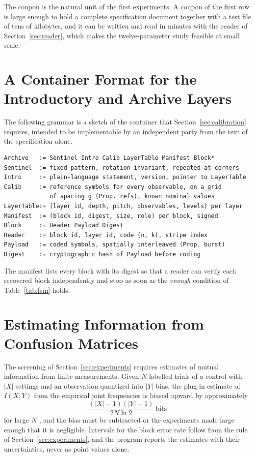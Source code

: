The coupon is the natural unit of the first experiments. A coupon of the first row is large enough to hold a complete specification document together with a test file of tens of kilobytes, and it can be written and read in minutes with the reader of Section~\ref{sec:reader}, which makes the twelve-parameter study feasible at small scale.

\section{A Container Format for the Introductory and Archive Layers}\label{app:format}

The following grammar is a sketch of the container that Section~\ref{sec:calibration} requires, intended to be implementable by an independent party from the text of the specification alone.
\begin{verbatim}
Archive   := Sentinel Intro Calib LayerTable Manifest Block*
Sentinel  := fixed pattern, rotation-invariant, repeated at corners
Intro     := plain-language statement, version, pointer to LayerTable
Calib     := reference symbols for every observable, on a grid
             of spacing g (Prop. refs), known nominal values
LayerTable:= (layer id, depth, pitch, observables, levels) per layer
Manifest  := (block id, digest, size, role) per block, signed
Block     := Header Payload Digest
Header    := block id, layer id, code (n, k), stripe index
Payload   := coded symbols, spatially interleaved (Prop. burst)
Digest    := cryptographic hash of Payload before coding
\end{verbatim}
The manifest lists every block with its digest so that a reader can verify each recovered block independently and stop as soon as the \emph{enough} condition of Table~\ref{tab:fsm} holds.

\section{Estimating Information from Confusion Matrices}\label{app:estimate}

The screening of Section~\ref{sec:experiments} requires estimates of mutual information from finite measurements. Given $N$ labelled trials of a control with $|X|$ settings and an observation quantized into $|Y|$ bins, the plug-in estimate of $I(X;Y)$ from the empirical joint frequencies is biased upward by approximately
\[
\frac{(|X|-1)(|Y|-1)}{2N\ln2}\ \text{bits}
\]
for large $N$ \cite{miller1955}, and the bias must be subtracted or the experiments made large enough that it is negligible. Intervals for the block error rate follow from the rule of Section~\ref{sec:experiments}, and the program reports the estimates with their uncertainties, never as point values alone.

